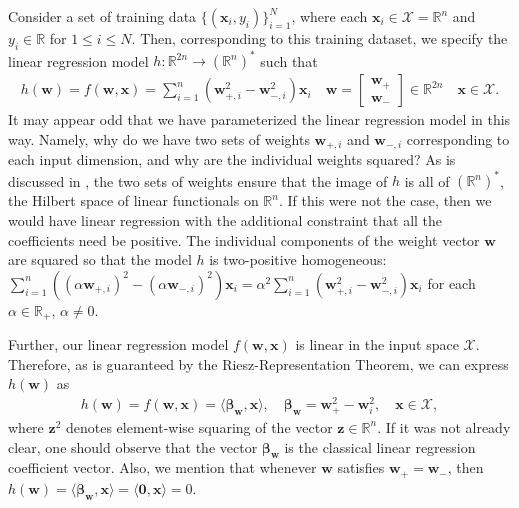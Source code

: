 \documentclass{article}
\begin{document}
Consider a set of training data $\{ (\boldsymbol{x}_i, y_i)\}_{i=1}^N$, where each $\boldsymbol{x}_i \in \mathcal{X} = \mathbb{R}^n$ and $y_i \in \mathbb{R}$ for $1 \leq i \leq N$. Then, corresponding to this training dataset, we specify the linear regression model $h: \mathbb{R}^{2n} \rightarrow (\mathbb{R}^n)^*$ such that
\begin{align}\label{linreg}
    h(\boldsymbol{w}) = f(\boldsymbol{w}, \boldsymbol{x}) = \sum_{i=1}^n(\boldsymbol{w}_{+, i}^2 - \boldsymbol{w}_{-, i}^2)\boldsymbol{x}_i \quad 
    \boldsymbol{w} = 
    \begin{bmatrix}
        \boldsymbol{w}_+ \\
        \boldsymbol{w}_-
    \end{bmatrix} 
    \in \mathbb{R}^{2n} \quad \boldsymbol{x} \in \mathcal{X}.
\end{align}
It may appear odd that we have parameterized the linear regression model in this way. Namely, why do we have two sets of weights $\boldsymbol{w}_{+, i}$ and $\boldsymbol{w}_{-, i}$ corresponding to each input dimension, and why are the individual weights squared? As is discussed in \cite{woodworth2020kernel}, the two sets of weights ensure that the image of $h$ is all of $(\mathbb{R}^n)^*$, the Hilbert space of linear functionals on $\mathbb{R}^n$. If this were not the case, then we would have linear regression with the additional constraint that all the coefficients need be positive. The individual components of the weight vector $\boldsymbol{w}$ are squared so that the model $h$ is two-positive homogeneous: $\sum_{i=1}^n((\alpha \boldsymbol{w}_{+, i})^2 - (\alpha \boldsymbol{w}_{-, i})^2)\boldsymbol{x}_i = \alpha^2\sum_{i=1}^n(\boldsymbol{w}_{+, i}^2 - \boldsymbol{w}_{-, i}^2)\boldsymbol{x}_i$ for each $\alpha \in \mathbb{R}_+$, $\alpha \neq 0$.

Further, our linear regression model $f(\boldsymbol{w}, \boldsymbol{x})$ is linear in the input space $\mathcal{X}$. Therefore, as is guaranteed by the Riesz-Representation Theorem, we can express $h(\boldsymbol{w})$ as 
\begin{align}
    h(\boldsymbol{w}) = f(\boldsymbol{w}, \boldsymbol{x}) = \langle \boldsymbol{\beta}_{\boldsymbol{w}}, \boldsymbol{x} \rangle, \quad \boldsymbol{\beta}_{\boldsymbol{w}} = \boldsymbol{w}_{+}^2 - \boldsymbol{w}_{i}^2, \quad \boldsymbol{x} \in \mathcal{X},
\end{align}
where $\boldsymbol{z}^2$ denotes element-wise squaring of the vector $\boldsymbol{z} \in \mathbb{R}^n$. If it was not already clear, one should observe that the vector $\boldsymbol{\beta}_{\boldsymbol{w}}$ is the classical linear regression coefficient vector. Also, we mention that whenever $\boldsymbol{w}$ satisfies $\boldsymbol{w}_+ = \boldsymbol{w}_-$, then $h(\boldsymbol{w}) = \langle \boldsymbol{\beta}_{\boldsymbol{w}}, \boldsymbol{x} \rangle = \langle \boldsymbol{0}, \boldsymbol{x} \rangle = 0$.
\end{document}
